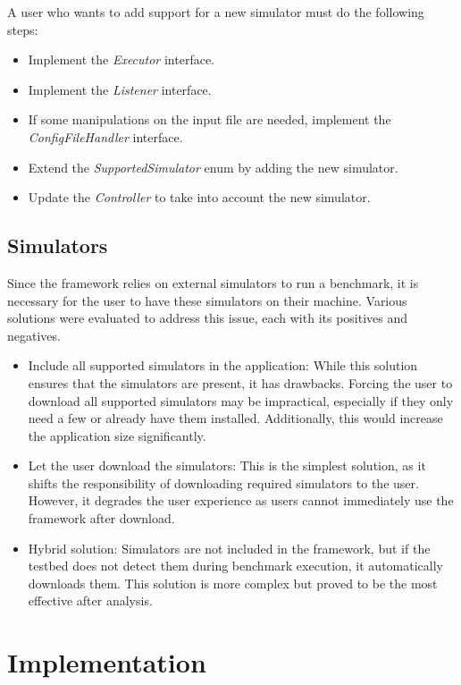 \documentclass[12pt,a4paper,openright,twoside]{book}
\begin{document}
A user who wants to add support for a new simulator must do the following steps:
\begin{itemize}
  \item Implement the \emph{Executor} interface.
  \item Implement the \emph{Listener} interface.
  \item If some manipulations on the input file are needed, implement the \emph{ConfigFileHandler} interface.
  \item Extend the \emph{SupportedSimulator} enum by adding the new simulator.
  \item Update the \emph{Controller} to take into account the new simulator.
\end{itemize}

\section{Simulators}

Since the framework relies on external simulators to run a benchmark, it is necessary for the user to have these simulators on their machine. 
Various solutions were evaluated to address this issue, each with its positives and negatives.
\begin{itemize}
  \item Include all supported simulators in the application: While this solution ensures that the simulators are present, it has drawbacks. 
  Forcing the user to download all supported simulators may be impractical, especially if they only need a few or already have them installed. 
  Additionally, this would increase the application size significantly.
  \item Let the user download the simulators: This is the simplest solution, as it shifts the responsibility of downloading required simulators to the user.
  However, it degrades the user experience as users cannot immediately use the framework after download.
  \item Hybrid solution: Simulators are not included in the framework, but if the testbed does not detect them during benchmark execution, it automatically downloads them. 
  This solution is more complex but proved to be the most effective after analysis.
\end{itemize}

\chapter{Implementation}
\end{document}
